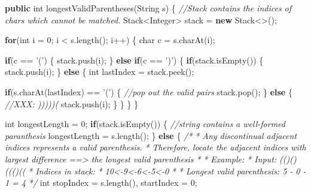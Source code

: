 \documentclass[]{book}
\newenvironment{Shaded}{\begin{snugshade}}{\end{snugshade}}
\newcommand{\BuiltInTok}[1]{#1}
\newcommand{\CharTok}[1]{\textcolor[rgb]{0.31,0.60,0.02}{#1}}
\newcommand{\CommentTok}[1]{\textcolor[rgb]{0.56,0.35,0.01}{\textit{#1}}}
\newcommand{\DataTypeTok}[1]{\textcolor[rgb]{0.13,0.29,0.53}{#1}}
\newcommand{\DecValTok}[1]{\textcolor[rgb]{0.00,0.00,0.81}{#1}}
\newcommand{\FunctionTok}[1]{\textcolor[rgb]{0.00,0.00,0.00}{#1}}
\newcommand{\KeywordTok}[1]{\textcolor[rgb]{0.13,0.29,0.53}{\textbf{#1}}}
\newcommand{\NormalTok}[1]{#1}
\begin{document}
\begin{Shaded}
\begin{Highlighting}[]
\KeywordTok{public} \DataTypeTok{int} \FunctionTok{longestValidParentheses}\NormalTok{(}\BuiltInTok{String}\NormalTok{ s) \{}
    \CommentTok{//Stack contains the indices of chars which cannot be matched.}
    \BuiltInTok{Stack}\NormalTok{<}\BuiltInTok{Integer}\NormalTok{> stack = }\KeywordTok{new} \BuiltInTok{Stack}\NormalTok{<>();}

    \KeywordTok{for}\NormalTok{(}\DataTypeTok{int}\NormalTok{ i = }\DecValTok{0}\NormalTok{; i < s.}\FunctionTok{length}\NormalTok{(); i++) \{}
        \DataTypeTok{char}\NormalTok{ c = s.}\FunctionTok{charAt}\NormalTok{(i);}

        \KeywordTok{if}\NormalTok{(c == }\CharTok{'('}\NormalTok{) \{}
\NormalTok{            stack.}\FunctionTok{push}\NormalTok{(i);}
\NormalTok{        \} }\KeywordTok{else} \KeywordTok{if}\NormalTok{(c == }\CharTok{')'}\NormalTok{) \{}
            \KeywordTok{if}\NormalTok{(stack.}\FunctionTok{isEmpty}\NormalTok{()) \{}
\NormalTok{            stack.}\FunctionTok{push}\NormalTok{(i);}
\NormalTok{            \} }\KeywordTok{else}\NormalTok{ \{}
                \DataTypeTok{int}\NormalTok{ lastIndex = stack.}\FunctionTok{peek}\NormalTok{();}

                \KeywordTok{if}\NormalTok{(s.}\FunctionTok{charAt}\NormalTok{(lastIndex) == }\CharTok{'('}\NormalTok{) \{}
                    \CommentTok{//pop out the valid pairs}
\NormalTok{                    stack.}\FunctionTok{pop}\NormalTok{();}
\NormalTok{                \} }\KeywordTok{else}\NormalTok{ \{}
                    \CommentTok{//XXX: )))))(}
\NormalTok{                    stack.}\FunctionTok{push}\NormalTok{(i);}
\NormalTok{                \}}
\NormalTok{            \}}
\NormalTok{        \}}
\NormalTok{    \}}

    \DataTypeTok{int}\NormalTok{ longestLength = }\DecValTok{0}\NormalTok{;}
    \KeywordTok{if}\NormalTok{(stack.}\FunctionTok{isEmpty}\NormalTok{()) \{}
        \CommentTok{//string contains a well-formed paranthesis}
\NormalTok{        longestLength = s.}\FunctionTok{length}\NormalTok{();}
\NormalTok{    \} }\KeywordTok{else}\NormalTok{ \{}
        \CommentTok{/*}
\CommentTok{        * Any discontinual adjacent indices represents a valid parenthesis.}
\CommentTok{        * Therefore, locate the adjacent indices with largest difference ==> the longest valid parenthesis}
\CommentTok{        *}
\CommentTok{        * Example:}
\CommentTok{        * Input: (()()((()((}
\CommentTok{        * Indices in stack:}
\CommentTok{        * 10<-9<-6<-5<-0}
\CommentTok{        *}
\CommentTok{        * Longest valid parenthesis: 5 - 0  - 1 = 4}
\CommentTok{        */}
        \DataTypeTok{int}\NormalTok{ stopIndex = s.}\FunctionTok{length}\NormalTok{(), startIndex = }\DecValTok{0}\NormalTok{;}


\end{Highlighting}
\end{Shaded}
\end{document}
